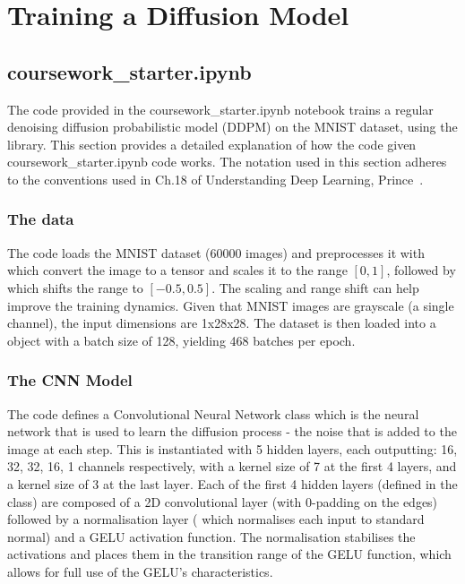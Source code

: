 
\section{Training a Diffusion Model}\label{sec:q1}
\subsection{coursework\_starter.ipynb}\label{subsec:q1a}
The code provided in the coursework\_starter.ipynb notebook trains a regular denoising diffusion probabilistic model
(DDPM) on the MNIST dataset, using the  library.
This section provides a detailed explanation of how the code given coursework\_starter.ipynb code works.
The notation used in this section adheres to the conventions used in Ch.18 of Understanding Deep Learning, Prince~\cite{prince}.

\subsubsection{The data}\label{subsubsec:data}
The code loads the MNIST dataset (60000 images) and preprocesses it with  which convert
the image to a tensor and scales it to the range $[0, 1]$, followed by 
which shifts the range to $[-0.5, 0.5]$.
The scaling and range shift can help improve the training dynamics.
Given that MNIST images are grayscale (a single channel), the input dimensions are 1x28x28.
The dataset is then loaded into a  object with a batch size of 128, yielding 468 batches per
epoch.

\subsubsection{The CNN Model}\label{subsubsec:cnn-model}
The code defines a Convolutional Neural Network  class which is the neural network that is used to
learn the diffusion process - the noise that is added to the image at each step.
This is instantiated with 5 hidden layers, each outputting: 16, 32, 32, 16, 1 channels respectively, with a kernel size
of 7 at the first 4 layers, and a kernel size of 3 at the last layer.
Each of the first 4 hidden layers (defined in the  class) are composed of a 2D convolutional layer
(with 0-padding on the edges) followed by a normalisation layer ( which normalises each input to
standard normal) and a GELU activation function.
The normalisation stabilises the activations and places them in the transition range of the GELU function, which allows
for full use of the GELU's characteristics.

